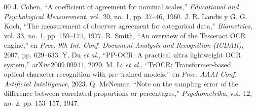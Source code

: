 \documentclass[conference]{IEEEtran}
\begin{document}
\begin{thebibliography}{00}
 J. Cohen, ``A coefficient of agreement for nominal scales,'' \textit{Educational and Psychological Measurement}, vol. 20, no. 1, pp. 37--46, 1960.
 J. R. Landis y G. G. Koch, ``The measurement of observer agreement for categorical data,'' \textit{Biometrics}, vol. 33, no. 1, pp. 159--174, 1977.
 R. Smith, ``An overview of the Tesseract OCR engine,'' en \textit{Proc. 9th Int. Conf. Document Analysis and Recognition (ICDAR)}, 2007, pp. 629--633.
 Y. Du \textit{et al.}, ``PP-OCR: A practical ultra lightweight OCR system,'' arXiv:2009.09941, 2020.
 M. Li \textit{et al.}, ``TrOCR: Transformer-based optical character recognition with pre-trained models,'' en \textit{Proc. AAAI Conf. Artificial Intelligence}, 2023.
 Q. McNemar, ``Note on the sampling error of the difference between correlated proportions or percentages,'' \textit{Psychometrika}, vol. 12, no. 2, pp. 153--157, 1947.
\end{thebibliography}
\end{document}
